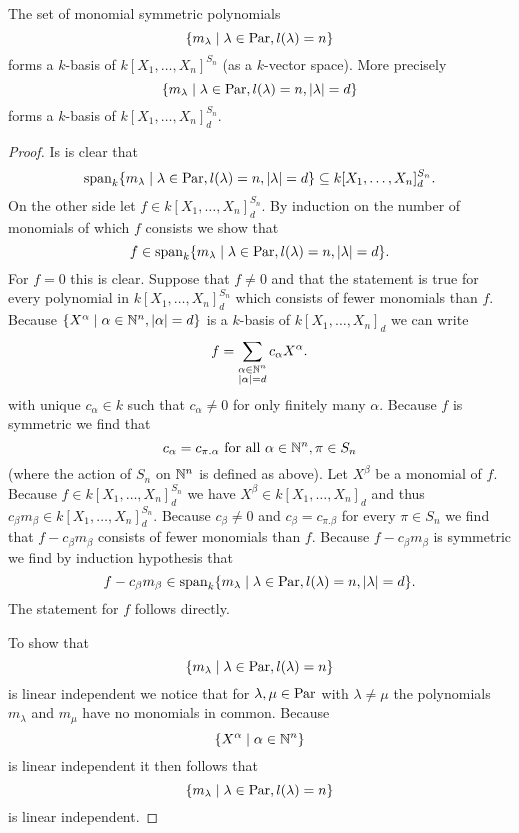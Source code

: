 \begin{lem}
 The set of monomial symmetric polynomials
 \[
  \{m_\lambda \mid \lambda \in \operatorname{Par}, l(\lambda) = n\}
 \]
 forms a $k$-basis of $k[X_1, \dotsc, X_n]^{S_n}$ (as a $k$-vector space). More precisely
 \[
  \{m_\lambda \mid \lambda \in \operatorname{Par}, l(\lambda) = n, |\lambda|=d \}
 \]
 forms a $k$-basis of $k[X_1, \dotsc, X_n]^{S_n}_d$.
\end{lem}
\begin{proof}
 Is is clear that
 \[
  \operatorname{span}_k \{m_\lambda \mid \lambda \in \operatorname{Par}, l(\lambda) = n, |\lambda|=d \} \subseteq k[X_1, \dotsc, X_n]^{S_n}_d.
 \]
 On the other side let $f \in k[X_1, \dotsc, X_n]^{S_n}_d$. By induction on the number of monomials of which $f$ consists we show that
 \[
  f \in \operatorname{span}_k \{m_\lambda \mid \lambda \in \operatorname{Par}, l(\lambda) = n, |\lambda|=d\}.
 \]
 For $f = 0$ this is clear. Suppose that $f \neq 0$ and that the statement is true for every polynomial in $k[X_1, \dotsc, X_n]^{S_n}_d$ which consists of fewer monomials than $f$. Because $\{X^\alpha \mid \alpha \in \mathbb{N}^n, |\alpha|=d \}$ is a $k$-basis of $k[X_1, \dotsc, X_n]_d$ we can write
 \[
  f = \sum_{\substack{\alpha \in \mathbb{N}^n \\ |\alpha|=d}} c_\alpha X^\alpha.
 \]
 with unique $c_\alpha \in k$ such that $c_\alpha \neq 0$ for only finitely many $\alpha$. Because $f$ is symmetric we find that
 \[
  c_\alpha = c_{\pi.\alpha} \text{ for all } \alpha \in \mathbb{N}^n, \pi \in S_n
 \]
 (where the action of $S_n$ on $\mathbb{N}^n$ is defined as above). Let $X^\beta$ be a monomial of $f$. Because $f \in k[X_1, \dotsc, X_n]^{S_n}_d$ we have $X^\beta \in k[X_1, \dotsc, X_n]_d$ and thus $c_\beta m_\beta \in k[X_1, \dotsc, X_n]^{S_n}_d$. Because $c_\beta \neq 0$ and $c_\beta = c_{\pi.\beta}$ for every $\pi \in S_n$ we find that $f-c_{\beta}m_\beta$ consists of fewer monomials than $f$. Because $f-c_{\beta}m_\beta$ is symmetric we find by induction hypothesis that
 \[
  f - c_{\beta}m_\beta \in \operatorname{span}_k \{m_\lambda \mid \lambda \in \operatorname{Par}, l(\lambda) = n, |\lambda|=d\}.
 \]
 The statement for $f$ follows directly.
 
 To show that
 \[
  \{m_\lambda \mid \lambda \in \operatorname{Par}, l(\lambda) = n\}
 \]
 is linear independent we notice that for $\lambda, \mu \in \operatorname{Par}$ with $\lambda \neq \mu$ the polynomials $m_\lambda$ and $m_\mu$ have no monomials in common. Because
 \[
  \{X^\alpha \mid \alpha \in \mathbb{N}^n\}
 \]
 is linear independent it then follows that
 \[
  \{m_\lambda \mid \lambda \in \operatorname{Par}, l(\lambda) = n\}
 \]
 is linear independent.
\end{proof}


